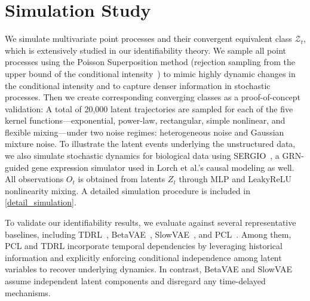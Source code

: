 \documentclass[10pt]{article}
\numberwithin{figure}{section}
\begin{document}
\section{Simulation Study}

We simulate multivariate point processes and their convergent equivalent class $\mathcal{Z}_t$, which is extensively studied in our identifiability theory.  We sample all point processes using the Poisson Superposition method (rejection sampling from the upper bound of the conditional intensity~\citep{cinlar1968superposition,albin1982poisson}) to mimic highly dynamic changes in the conditional intensity and to capture denser information in stochastic processes. Then we create corresponding converging classes as a proof-of-concept validation: A total of 20,000 latent trajectories are sampled for each of the five kernel functions—exponential, power-law, rectangular, simple nonlinear, and flexible mixing—under two noise regimes: heterogeneous noise and Gaussian mixture noise. To illustrate the latent events underlying the unstructured data, we also simulate stochastic dynamics for biological data using SERGIO~\citep{dibaeinia2020sergio}, a GRN-guided gene expression simulator used in Lorch et al.’s \cite{pmlr-v238-lorch24a}  causal modeling as well. All observations $O_t$ is obtained from latents $Z_t$ through MLP and LeakyReLU nonlinearity mixing. A detailed simulation procedure is included in \ref{detail_simulation}.

To validate our identifiability results, we evaluate against several representative baselines, including TDRL~\citep{yao_temporally_2022}, BetaVAE~\citep{higgins2017beta}, SlowVAE~\citep{klindt_towards_2021}, and PCL~\citep{hyvarinen_nonlinear_2017}. Among them, PCL and TDRL incorporate temporal dependencies by leveraging historical information and explicitly enforcing conditional independence among latent variables to recover underlying dynamics. In contrast, BetaVAE and SlowVAE assume independent latent components and disregard any time-delayed mechanisms. 
\end{document}
